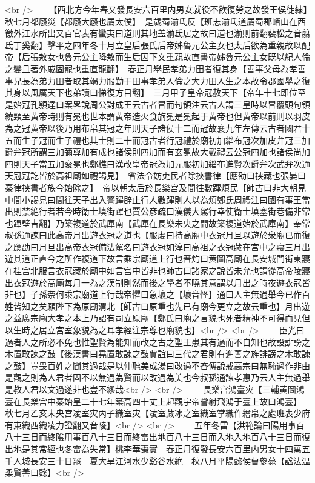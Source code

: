 <br />
　　【西北方今年春又發長安六百里内男女就役不欲復勞之故發王侯徒隸】　秋七月都廏災【都廏大廏也屬太僕】　是歲蜀湔氐反【班志湔氐道屬蜀郡㟭山在西徼外江水所出又百官表有蠻夷曰道則其地盖湔氐居之故曰道也湔則前翻裴松之音翦氐丁奚翻】擊平之四年冬十月立皇后張氏后帝姊魯元公主女也太后欲為重親故以配帝【后張敖女也魯元公主降敖而生后因下文重親故直書帝姊魯元公主女既以紀人倫之變且著外戚固寵也重直龍翻】　春正月舉民孝弟力田者復其身【善事父母為孝善事兄長為弟力田者取其竭力服勤于田事孝弟人倫之大力田人生之本故令郡國舉之復其身以風厲天下也弟讀曰悌復方目翻】　三月甲子皇帝冠赦天下【帝年十七即位至是始冠孔頴達曰案畧說周公對成王云古者冒而句領注云古人謂三皇時以冒覆頭句領繞頸至黄帝時則有冕也世本謂黄帝造火食旃冕是冕起于黄帝也但黄帝以前則以羽皮為之冠黄帝以後乃用布帛其冠之年則天子諸侯十二而冠故襄九年左傳云古者國君十五而生子冠而生子禮也其士則二十而冠古者行冠禮於廟初加緇布冠次加皮弁冠三加爵弁冠所謂三加彌尊加有成也諸侯則四加而有玄冕故大戴禮云公冠四加也諸侯尚加四則天子當五加衮冕也鄭樵曰漢改皇帝冠為加元服初加緇布進賢次爵弁次武弁次通天冠冠訖皆於高祖廟如禮謁見】　省法令妨吏民者除挾書律【應劭曰挟藏也張晏曰秦律挟書者族今始除之】　帝以朝太后於長樂宫及間往數蹕煩民【師古曰非大朝見中間小謁見曰間往天子出入警蹕辟止行人數蹕則人以為煩鄭氏周禮注曰國有事王當出則禁絶行者若今時衛士填街蹕也賈公彦疏曰漢儀大駕行幸使衛士填塞街巷備非常也蹕壁吉翻】乃築複道於武庫南【武庫在長樂未央之間故築複道始於武庫南】奉常叔孫通諫曰此高帝月出遊衣冠之道也【服䖍曰持高廟中衣冠月旦以遊於衆廟已而復之應劭曰月旦出高帝衣冠備法駕名曰遊衣冠如淳曰高祖之衣冠藏在宫中之寢三月出遊其道正直今之所作複道下故言乘宗廟道上行也晉灼曰黄圖高廟在長安城門街東寢在桂宫北服言衣冠藏於廟中如言宫中皆非也師古曰諸家之說皆未允也謂從高帝陵寢出衣冠遊於高廟每月一為之漢制則然而後之學者不曉其意謂以月出之時夜遊衣冠皆非也】子孫奈何乘宗廟道上行哉帝懼曰急壞之【壞音怪】通曰人主無過舉今已作百姓皆知之矣願陛下為原廟渭北【師古曰原重也先已有廟今更立之故云重也】月出遊之益廣宗廟大孝之本上乃詔有司立原廟【鄭氏曰廟之言貌也死者精神不可得而見但以生時之居立宫室象貌為之耳孝經注宗尊也廟貌也】<br />
<br />
　　臣光曰過者人之所必不免也惟聖賢為能知而改之古之聖王患其有過而不自知也故設誹謗之木置敢諫之鼓【後漢書曰堯置敢諫之鼓賈誼曰三代之君則有進善之旌誹謗之木敢諫之鼓】豈畏百姓之聞其過哉是以仲虺美成湯曰改過不吝傅說戒高宗曰無恥過作非由是觀之則為人君者固不以無過為賢而以改過為美也今叔孫通諫孝惠乃云人主無過舉是教人君以文過遂非也豈不繆哉<br />
<br />
　　長樂宫鴻臺灾【三輔黄圖鴻臺在長樂宫中秦始皇二十七年築高四十丈上起觀宇帝嘗射飛鴻于臺上故曰鴻臺】　秋七月乙亥未央宫凌室灾丙子織室灾【凌室藏冰之室織室掌織作繒帛之處班表少府有東織西織凌力證翻又音陵】<br />
<br />
　　五年冬雷【洪範論曰陽用事百八十三日而終隂用事百八十三日而終雷出地百八十三日而入地入地百八十三日而復出地是其常經也冬雷為失常】桃李華棗實　春正月復發長安六百里内男女十四萬五千人城長安三十日罷　夏大旱江河水少谿谷水絶　秋八月平陽懿侯曹參薨【諡法温柔賢善曰懿】<br />
